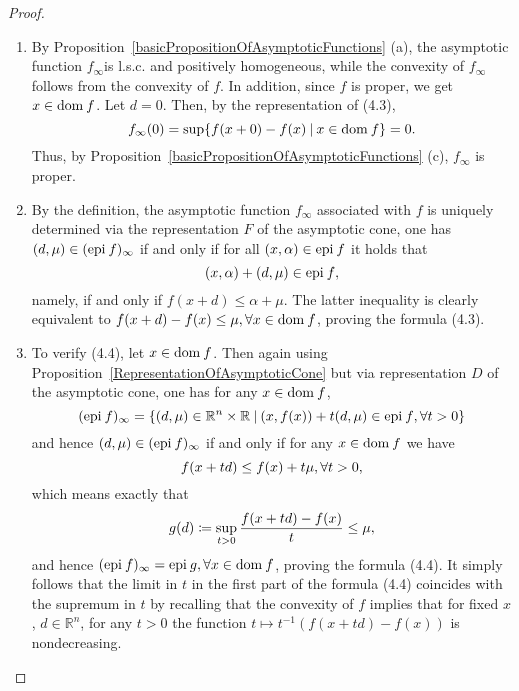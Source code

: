 \documentclass[a4paper,11pt, oneside]{book}
\theoremstyle{definition}
\newcommand{\RealNumberSet}{\mathbb{R}}
\newcommand{\NDemenstionalRealEuclideanSpace}{\mathbb{R}^n}
\newcommand{\Domain}[1]{\text{\rm dom\:${#1}$}} %
\newcommand{\Epigraph}[1]{\text{\rm epi\:${#1}$}} %
\newcommand{\SetForm}[2]{
  \{{#1}\:|\:{#2}\}
}
\begin{document}
\begin{proof}
  \begin{enumerate}[label=\roman*,align=CenterWithParen]
    \item By Proposition~\ref{basicPropositionOfAsymptoticFunctions} (a), the asymptotic function $f_{\infty}$is l.s.c. and positively homogeneous, while the convexity of $f_{\infty}$ follows from the convexity of $f$. In addition, since $f$ is proper, we get $x \in \Domain{f}$. Let $d = 0$. Then, by the representation of (4.3),
    \begin{equation}
      f_{\infty}(0) = \sup \{f(x+0) -f(x) \:|\: x \in \Domain{f}\} = 0. \notag
    \end{equation}
    Thus, by Proposition~\ref{basicPropositionOfAsymptoticFunctions} (c), $f_{\infty}$ is proper.
    \item By the definition, the asymptotic function $f_{\infty}$ associated with $f$ is uniquely determined via the representation $F$ of the asymptotic cone, one has $(d,\mu) \in (\Epigraph{f})_{\infty}$ if and only if for all $(x, \alpha) \in \Epigraph{f}$ it holds that
    \begin{equation}
      (x, \alpha) + (d, \mu) \in \Epigraph{f}, \notag
    \end{equation}
    namely, if and only if $f(x+d) \leq \alpha + \mu$. The latter inequality is clearly equivalent to $f(x+d) - f(x) \leq \mu, \forall x \in \Domain{f}$, proving the formula (4.3).
    \item To verify (4.4), let $x \in \Domain{f}$. Then again using Proposition~\ref{RepresentationOfAsymptoticCone} but via representation $D$ of the asymptotic cone, one has for any $x \in \Domain{f}$,
    \begin{equation}
      (\Epigraph{f})_{\infty} = \SetForm{(d,\mu) \in \NDemenstionalRealEuclideanSpace \times \RealNumberSet}{(x, f(x)) + t(d,\mu) \in \Epigraph{f}, \forall t>0} \notag
    \end{equation}
    and hence $(d,\mu) \in (\Epigraph{f})_{\infty}$ if and only if for any $x \in \Domain{f}$ we have
    \begin{equation}
      f(x+td) \leq f(x) + t\mu, \forall t>0, \notag
    \end{equation}
    which means exactly that
    \begin{equation}
      g(d) \coloneqq \sup_{t>0} \frac{f(x+td) - f(x)}{t} \leq \mu, \notag
    \end{equation}
    and hence $(\Epigraph{f})_{\infty} = \Epigraph{g}, \forall x \in \Domain{f}$, proving the formula (4.4).
    It simply follows that the limit in $t$ in the first part of the formula (4.4) coincides with the supremum in $t$ by recalling that the convexity of $f$ implies that for fixed $x$, $d\in\NDemenstionalRealEuclideanSpace$, for any $t>0$ the function $t \mapsto t^{-1}(f(x+td)-f(x))$ is nondecreasing.
  \end{enumerate}

\end{proof}
\end{document}
